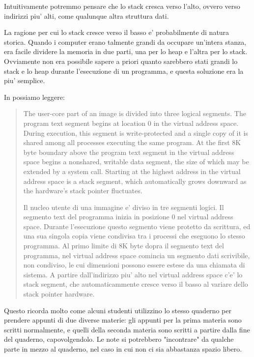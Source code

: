 \label{stack_grow_backwards}

Intuitivamente potremmo pensare che lo stack cresca verso l'alto, ovvero verso indirizzi piu' alti, come qualunque altra struttura dati.

La ragione per cui lo stack cresce verso il basso e' probabilmente di natura storica.
Quando i computer erano talmente grandi da occupare un'intera stanza, era facile dividere la memoria in due parti, una per lo 
\gls{heap} e l'altra per lo stack.
Ovviamente non era possibile sapere a priori quanto sarebbero stati grandi lo stack e lo \gls{heap} durante l'esecuzione di un programma,
e questa soluzione era la piu' semplice.



In \RitchieThompsonUNIX possiamo leggere:

\begin{framed}
\begin{quotation}
The user-core part of an image is divided into three logical segments.
The program text segment begins at location 0 in the virtual address space.
During execution, this segment is write-protected and a single copy of it is shared among all processes executing the same program.
At the first 8K byte boundary above the program text segment in the virtual address space begins a nonshared, writable data segment, the size of which may be extended by a system call.
Starting at the highest address in the virtual address space is a stack segment, which automatically grows downward as the hardware's stack pointer fluctuates.

Il nucleo utente di una immagine e' diviso in tre segmenti logici.
Il segmento text del programma inizia in posizione 0 nel virtual address space.
Durante l'esecuzione questo segmento viene protetto da scrittura, ed una sua singola copia viene condivisa tra i processi che eseguono lo stesso programma.
Al primo limite di 8K byte dopra il segmento text del programma, nel virtual address space comincia un segmento dati scrivibile, non condiviso, le cui dimensioni possono essere estese da una chiamata di sistema.
A partire dall'indirizzo piu' alto nel virtual address space c'e' lo stack segment, che automaticammente cresce verso il basso al variare dello stack pointer hardware.
\end{quotation}
\end{framed}

Questo ricorda molto come alcuni studenti utilizzino lo stesso quaderno per prendere appunti di due diverse materie:
gli appunti per la prima materia sono scritti normalmente, e quelli della seconda materia sono scritti a partire dalla fine del quaderno, capovolgendolo.
Le note si potrebbero "incontrare" da qualche parte in mezzo al quaderno, nel caso in cui non ci sia abbastanza spazio libero.

